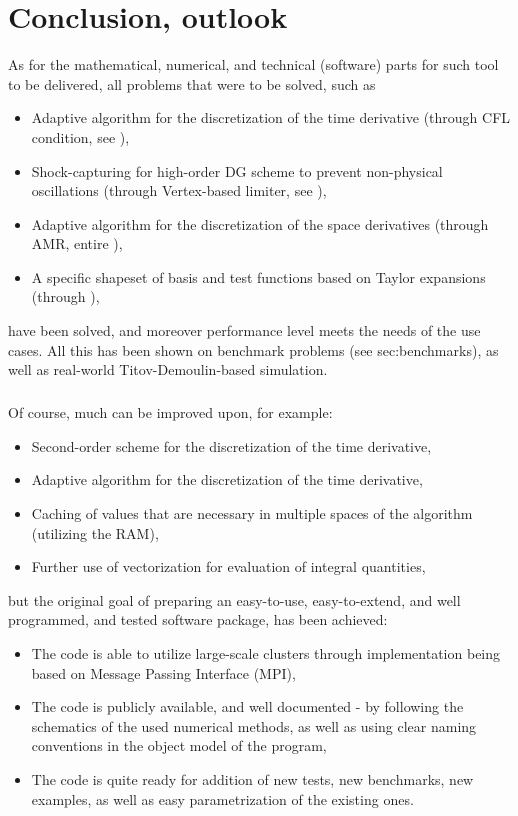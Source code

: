 \chapter{Conclusion, outlook}
As for the mathematical, numerical, and technical (software) parts for such tool to be delivered, all problems that were to be solved, such as
\begin{itemize}
	\item Adaptive algorithm for the discretization of the time derivative (through CFL condition, see ),
	\item Shock-capturing for high-order DG scheme to prevent non-physical oscillations (through Vertex-based limiter, see ),
	\item Adaptive algorithm for the discretization of the space derivatives (through AMR, entire ),
	\item A specific shapeset of basis and test functions based on Taylor expansions (through ),
\end{itemize}
have been solved, and moreover performance level meets the needs of the use cases. All this has been shown on benchmark problems (see {sec:benchmarks}), as well as real-world Titov-Demoulin-based simulation.
\paragraph{}
Of course, much can be improved upon, for example:
\begin{itemize}
	\item Second-order scheme for the discretization of the time derivative,
	\item Adaptive algorithm for the discretization of the time derivative,
	\item Caching of values that are necessary in multiple spaces of the algorithm (utilizing the RAM),
	\item Further use of vectorization for evaluation of integral quantities,
\end{itemize}
but the original goal of preparing an easy-to-use, easy-to-extend, and well programmed, and tested software package, has been achieved:
\begin{itemize}
\item The code is able to utilize large-scale clusters through implementation being based on Message Passing Interface (MPI),
\item The code is publicly available, and well documented - by following the schematics of the used numerical methods, as well as using clear naming conventions in the object model of the program,
\item The code is quite ready for addition of new tests, new benchmarks, new examples, as well as easy parametrization of the existing ones.
\end{itemize}

